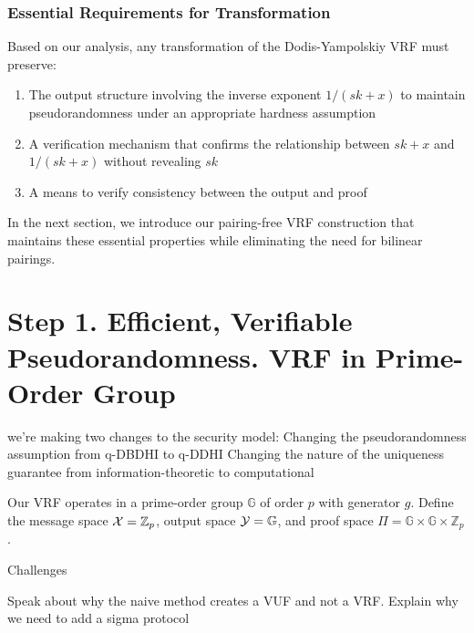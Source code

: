 \subsubsection{Essential Requirements for Transformation}

Based on our analysis, any transformation of the Dodis-Yampolskiy VRF must preserve:

\begin{enumerate}
    \item The output structure involving the inverse exponent $1/(sk+x)$ to maintain pseudorandomness under an appropriate hardness assumption
    
    \item A verification mechanism that confirms the relationship between $sk+x$ and $1/(sk+x)$ without revealing $sk$
    
    \item A means to verify consistency between the output and proof
\end{enumerate}

In the next section, we introduce our pairing-free VRF construction that maintains these essential properties while eliminating the need for bilinear pairings.







\section{Step 1. Efficient, Verifiable Pseudorandomness. VRF in Prime-Order Group}
we're making two changes to the security model:
Changing the pseudorandomness assumption from q-DBDHI to q-DDHI
Changing the nature of the uniqueness guarantee from information-theoretic to computational

Our VRF operates in a prime-order group $\mathbb{G}$ of order $p$ with generator $g$. Define the message space $\mathcal{X} = \mathbb{Z}_p$, output space $\mathcal{Y} = \mathbb{G}$, and proof space $\Pi = \mathbb{G} \times \mathbb{G} \times \mathbb{Z}_p$. 


Challenges

Speak about why the naive method creates a VUF and not a VRF. Explain why we need to add a sigma protocol



